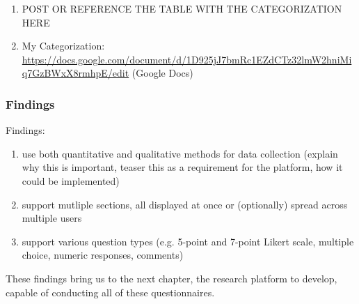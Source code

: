 	\begin{enumerate}
		\item POST OR REFERENCE THE TABLE WITH THE CATEGORIZATION HERE
		\item My Categorization: \url{https://docs.google.com/document/d/1D925jJ7bmRc1EZdCTz32lmW2hniMiq7GzBWxX8rmhpE/edit} (Google Docs)
	\end{enumerate}






\subsubsection{Findings}
\label{sec:questionnaires-findings}



	Findings: 
	\begin{enumerate}
	\item use both quantitative and qualitative methods for data collection (explain why this is important, teaser this as a requirement for the platform, how it could be implemented)
	\item support mutliple sections, all displayed at once or (optionally) spread across multiple users
	\item support various question types (e.g. 5-point and 7-point Likert scale, multiple choice, numeric responses, comments)
	\end{enumerate}




	These findings bring us to the next chapter, the research platform to develop, capable of conducting all of these questionnaires.













